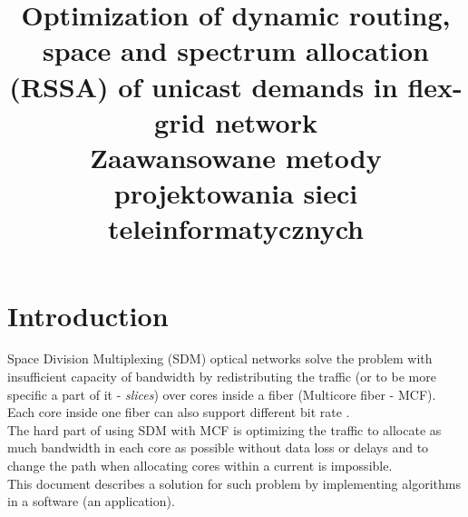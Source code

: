 \documentclass[conference]{IEEEtran}
\begin{document}
\title{Optimization of dynamic routing, space and spectrum allocation
(RSSA) of unicast demands in flex-grid network\\
{\footnotesize \textsuperscript{} Zaawansowane metody projektowania sieci teleinformatycznych}
}

\author{
\and
{}
}

\maketitle

\section{Introduction}
Space Division Multiplexing (SDM) optical networks solve the problem with insufficient capacity of bandwidth by redistributing the traffic (or to be more specific a part of it - \textit{slices}) over cores inside a fiber (Multicore fiber - MCF). Each core inside one fiber can also support different bit rate \cite{b1}.
\\
The hard part of using SDM with MCF is optimizing the traffic to allocate as much bandwidth in each core as possible without data loss or delays and to change the path when allocating cores within a current is impossible.
\\
This document describes a solution for such problem by implementing algorithms in a software (an application). 
\end{document}
